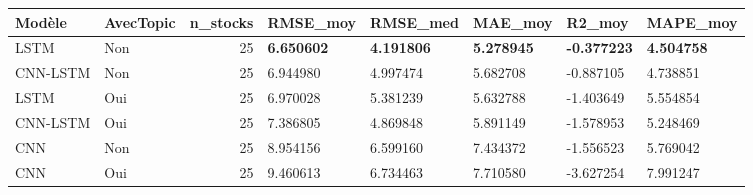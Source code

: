 \begin{tabular}{llrlllll}
\toprule
Modèle & AvecTopic & n_stocks & RMSE_moy & RMSE_med & MAE_moy & R2_moy & MAPE_moy \\
\midrule
LSTM & Non & 25 & \textbf{6.650602} & \textbf{4.191806} & \textbf{5.278945} & \textbf{-0.377223} & \textbf{4.504758} \\
CNN-LSTM & Non & 25 & 6.944980 & 4.997474 & 5.682708 & -0.887105 & 4.738851 \\
LSTM & Oui & 25 & 6.970028 & 5.381239 & 5.632788 & -1.403649 & 5.554854 \\
CNN-LSTM & Oui & 25 & 7.386805 & 4.869848 & 5.891149 & -1.578953 & 5.248469 \\
CNN & Non & 25 & 8.954156 & 6.599160 & 7.434372 & -1.556523 & 5.769042 \\
CNN & Oui & 25 & 9.460613 & 6.734463 & 7.710580 & -3.627254 & 7.991247 \\
\bottomrule
\end{tabular}
